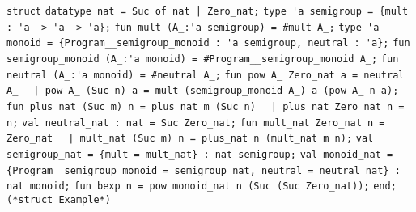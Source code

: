 \begin{isabellebody}
\begin{isamarkuptext}
\verb|struct|\newline%
\newline%
\verb|datatype nat = Suc of nat |\verb,|,\verb| Zero_nat;|\newline%
\newline%
\verb|type 'a semigroup = {mult : 'a -> 'a -> 'a};|\newline%
\verb|fun mult (A_:'a semigroup) = #mult A_;|\newline%
\newline%
\verb|type 'a monoid = {Program__semigroup_monoid : 'a semigroup, neutral : 'a};|\newline%
\verb|fun semigroup_monoid (A_:'a monoid) = #Program__semigroup_monoid A_;|\newline%
\verb|fun neutral (A_:'a monoid) = #neutral A_;|\newline%
\newline%
\verb|fun pow A_ Zero_nat a = neutral A_|\newline%
\verb|  |\verb,|,\verb| pow A_ (Suc n) a = mult (semigroup_monoid A_) a (pow A_ n a);|\newline%
\newline%
\verb|fun plus_nat (Suc m) n = plus_nat m (Suc n)|\newline%
\verb|  |\verb,|,\verb| plus_nat Zero_nat n = n;|\newline%
\newline%
\verb|val neutral_nat : nat = Suc Zero_nat;|\newline%
\newline%
\verb|fun mult_nat Zero_nat n = Zero_nat|\newline%
\verb|  |\verb,|,\verb| mult_nat (Suc m) n = plus_nat n (mult_nat m n);|\newline%
\newline%
\verb|val semigroup_nat = {mult = mult_nat} : nat semigroup;|\newline%
\newline%
\verb|val monoid_nat =|\newline%
\verb|  {Program__semigroup_monoid = semigroup_nat, neutral = neutral_nat} :|\newline%
\verb|  nat monoid;|\newline%
\newline%
\verb|fun bexp n = pow monoid_nat n (Suc (Suc Zero_nat));|\newline%
\newline%
\verb|end; (*struct Example*)|%
\end{isamarkuptext}%
\isamarkuptrue%

\end{isabellebody}
